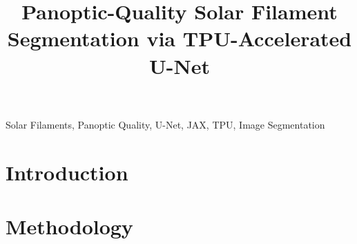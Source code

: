 \documentclass[conference]{IEEEtran}
\begin{document}
\title{Panoptic-Quality Solar Filament Segmentation via TPU-Accelerated U-Net}

\author{
}

\maketitle

\begin{abstract}
\end{abstract}

\begin{IEEEkeywords}
Solar Filaments, Panoptic Quality, U-Net, JAX, TPU, Image Segmentation
\end{IEEEkeywords}

\section{Introduction}

\section{Methodology}
\end{document}
